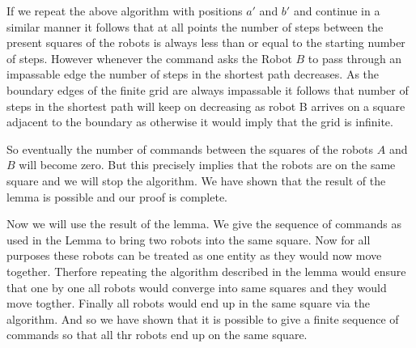 \documentclass[a4paper]{article}
\begin{document}
If we repeat the above algorithm with positions $a'$ and $b'$ and continue in a similar manner it follows that at all points the number of steps between the present squares of the robots is always less than or equal to the starting number of steps. \newline
However whenever the command asks the Robot $B$ to pass through an impassable edge the number of steps in the shortest path decreases.
As the boundary edges of the finite grid are always impassable it follows that number of steps in the shortest path will keep on decreasing as robot B arrives on a square adjacent to the boundary as otherwise it would imply that the grid is infinite. 

So eventually the number of commands between the squares of the robots $A$ and $B$ will become zero. But this precisely implies that the robots are on the same square and we will stop the algorithm. We have shown that the result of the lemma is possible and our proof is complete.\newline


Now we will use the result of the lemma. We give the sequence of commands as used in the Lemma to bring two robots into the same square. Now for all purposes these robots can be treated as one entity as they would now move together. Therfore repeating the algorithm described in the lemma would ensure that one by one all robots would converge into same squares and they would move togther. Finally all robots would end up in the same square via the algorithm. And so we have shown that it is possible to give a finite sequence of commands so that all thr robots end up on the same square.

 
\end{document}
